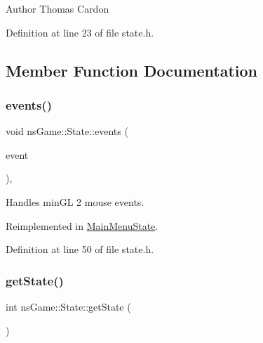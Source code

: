 \begin{DoxyAuthor}{Author}
Thomas Cardon 
\end{DoxyAuthor}


Definition at line 23 of file state.\+h.



\subsection{Member Function Documentation}
\mbox{\label{classns_game_1_1_state_a2e1daaca20e580bdb4baf8215e1b51c9}} 
\subsubsection{\texorpdfstring{events()}{events()}}
{\footnotesize\ttfamily void ns\+Game\+::\+State\+::events (\begin{DoxyParamCaption}\item[{ns\+Event\+::\+Event\+\_\+t}]{event }\end{DoxyParamCaption})\hspace{0.3cm}{\ttfamily [inline]}, {\ttfamily [virtual]}}



Handles min\+GL 2 mouse events. 



Reimplemented in \hyperlink{class_main_menu_state_a6d740479d4dce733c069921478d70a37}{Main\+Menu\+State}.



Definition at line 50 of file state.\+h.

\mbox{\label{classns_game_1_1_state_abcc65369e15769b5c6ae588f61beeb02}} 
\subsubsection{\texorpdfstring{get\+State()}{getState()}}
{\footnotesize\ttfamily int ns\+Game\+::\+State\+::get\+State (\begin{DoxyParamCaption}{ }\end{DoxyParamCaption})\hspace{0.3cm}{\ttfamily [inline]}}



